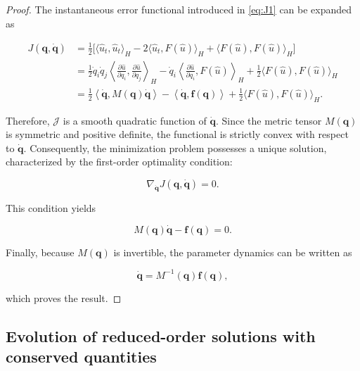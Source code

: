 \begin{proof}
    The instantaneous error functional introduced in \eqref{eq:J1} can be expanded as

    \begin{align*}
        J(\mathbf q,\dot{\mathbf q})
        &=
        \frac12 \Big[
        \langle \hat u_t,\hat u_t\rangle_H
        -2\langle \hat u_t, F(\hat u)\rangle_H
        +\langle F(\hat u), F(\hat u)\rangle_H
        \Big] \\
        &=
        \frac12 \dot q_i \dot q_j
        \left\langle
        \frac{\partial \hat u}{\partial q_i},
        \frac{\partial \hat u}{\partial q_j}
        \right\rangle_H
        -
        \dot q_i
        \left\langle
        \frac{\partial \hat u}{\partial q_i},
        F(\hat u)
        \right\rangle_H
        +
        \frac12 \langle F(\hat u), F(\hat u)\rangle_H \\
        &=
        \frac12 \left\langle \dot{\mathbf q}, M(\mathbf q)\dot{\mathbf q} \right\rangle
        -
        \left\langle \dot{\mathbf q}, \mathbf f(\mathbf q) \right\rangle
        +
        \frac12 \langle F(\hat u), F(\hat u)\rangle_H.
    \end{align*}

    Therefore, $\mathcal J$ is a smooth quadratic function of $\dot{\mathbf q}$. 
    Since the metric tensor $M(\mathbf q)$ is symmetric and positive definite, the functional is strictly convex with respect to $\dot{\mathbf q}$. 
    Consequently, the minimization problem possesses a unique solution, characterized by the first-order optimality condition:
    
    \begin{equation}
    \nabla_{\dot{\mathbf q}} J(\mathbf q,\dot{\mathbf q}) = 0.
    \end{equation}
    
    This condition yields
    
    \begin{equation}
    M(\mathbf q)\dot{\mathbf q}-\mathbf f(\mathbf q)=0.
    \end{equation}
    
    Finally, because $M(\mathbf q)$ is invertible, the parameter dynamics can be written as
    
    \begin{equation}
    \dot{\mathbf q}=M^{-1}(\mathbf q)\mathbf f(\mathbf q),
    \end{equation}
    
    which proves the result.
\end{proof}




\subsection{Evolution of reduced-order solutions with conserved quantities}